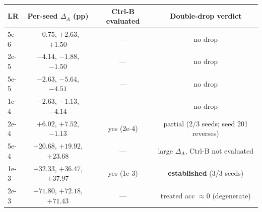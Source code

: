 \begin{tabular}{lccc}
\toprule
LR & Per-seed $\Delta_A$ (pp) & Ctrl-B evaluated & Double-drop verdict \\
\midrule
5e-6 & $-0.75$, $+2.63$, $+1.50$ & --- & no drop \\
2e-5 & $-4.14$, $-1.88$, $-1.50$ & --- & no drop \\
5e-5 & $-2.63$, $-5.64$, $-4.51$ & --- & no drop \\
1e-4 & $-2.63$, $-1.13$, $-4.14$ & --- & no drop \\
2e-4 & $+6.02$, $+7.52$, $-1.13$ & yes (2e-4) & partial (2/3 seeds; seed 201 reverses) \\
5e-4 & $+20.68$, $+19.92$, $+23.68$ & --- & large $\Delta_A$, Ctrl-B not evaluated \\
1e-3 & $+32.33$, $+36.47$, $+37.97$ & yes (1e-3) & \textbf{established} (3/3 seeds) \\
2e-3 & $+71.80$, $+72.18$, $+71.43$ & --- & treated acc $\approx 0$ (degenerate) \\
\bottomrule
\end{tabular}
